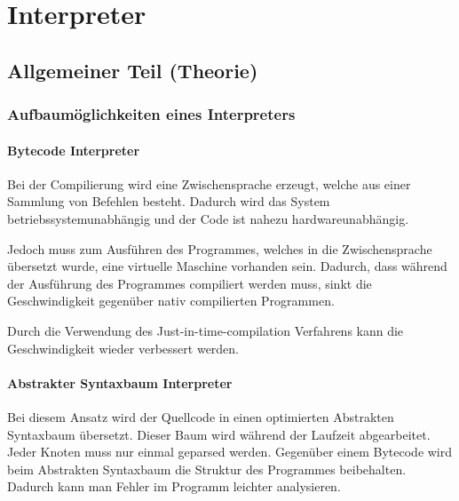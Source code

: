 

\chapter{Interpreter}


\section{Allgemeiner Teil (Theorie)}

\subsection{Aufbaumöglichkeiten eines Interpreters}

\subsubsection{Bytecode Interpreter}
Bei der Compilierung wird eine Zwischensprache erzeugt, welche aus einer Sammlung von Befehlen besteht. Dadurch wird das System
betriebssystemunabhängig und der Code ist nahezu hardwareunabhängig.

Jedoch muss zum Ausführen des Programmes, welches in die Zwischensprache übersetzt wurde, eine virtuelle Maschine vorhanden sein.
Dadurch, dass während der Ausführung des Programmes compiliert werden muss, sinkt die Geschwindigkeit gegenüber
nativ compilierten Programmen.

Durch die Verwendung des Just-in-time-compilation Verfahrens kann die Geschwindigkeit wieder verbessert werden.

\subsubsection{Abstrakter Syntaxbaum Interpreter}
Bei diesem Ansatz wird der Quellcode in einen optimierten Abstrakten Syntaxbaum übersetzt. Dieser Baum wird während der Laufzeit
abgearbeitet. Jeder Knoten muss nur einmal geparsed werden. Gegenüber einem Bytecode wird beim Abstrakten Syntaxbaum die Struktur
des Programmes beibehalten. Dadurch kann man Fehler im Programm leichter analysieren.

